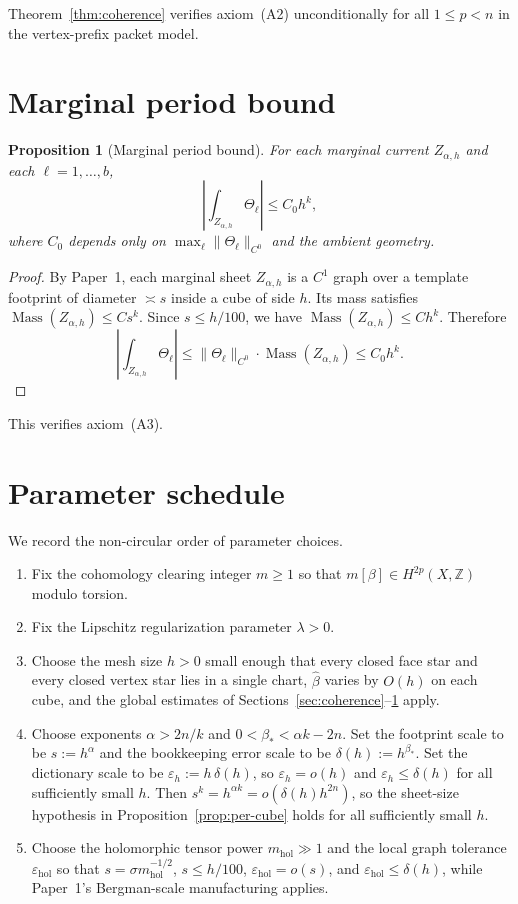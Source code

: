 \documentclass[11pt]{article}
\numberwithin{equation}{section}
\theoremstyle{plain}
\newtheorem{proposition}[theorem]{Proposition}
\theoremstyle{definition}
\theoremstyle{remark}
\DeclareMathOperator{\Mass}{Mass}
\newcommand{\Z}{\mathbb{Z}}
\newcommand{\eps}{\varepsilon}
\newcommand{\mhol}{m_{\mathrm{hol}}}
\begin{document}
Theorem~\ref{thm:coherence} verifies axiom~(A2) unconditionally for all $1\le p<n$ in the vertex-prefix packet model.

\section{Marginal period bound}\label{sec:period}

\begin{proposition}[Marginal period bound]\label{prop:period-bound}
For each marginal current $Z_{\alpha,h}$ and each $\ell=1,\dots,b$,
\[
\left|\int_{Z_{\alpha,h}}\Theta_\ell\right|\le C_0 h^k,
\]
where $C_0$ depends only on $\max_\ell\|\Theta_\ell\|_{C^0}$ and the ambient geometry.
\end{proposition}

\begin{proof}
By Paper~1, each marginal sheet $Z_{\alpha,h}$ is a $C^1$ graph over a template footprint of diameter $\asymp s$ inside a cube of side $h$.  Its mass satisfies $\Mass(Z_{\alpha,h})\le C s^k$.  Since $s\le h/100$, we have $\Mass(Z_{\alpha,h})\le C h^k$.  Therefore
\[
\left|\int_{Z_{\alpha,h}}\Theta_\ell\right|\le \|\Theta_\ell\|_{C^0}\cdot\Mass(Z_{\alpha,h})\le C_0 h^k.
\]
\end{proof}

This verifies axiom~(A3).

\section{Parameter schedule}\label{sec:parameters}

We record the non-circular order of parameter choices.

\begin{enumerate}
\item Fix the cohomology clearing integer $m\ge 1$ so that $m[\beta]\in H^{2p}(X,\Z)$ modulo torsion.
\item Fix the Lipschitz regularization parameter $\lambda>0$.
\item Choose the mesh size $h>0$ small enough that every closed face star and every closed vertex star lies in a single chart, $\widehat\beta$ varies by $O(h)$ on each cube, and the global estimates of Sections~\ref{sec:coherence}--\ref{sec:period} apply.
\item Choose exponents $\alpha>2n/k$ and $0<\beta_\ast<\alpha k-2n$.  Set the footprint scale to be $s:=h^\alpha$ and the bookkeeping error scale to be $\delta(h):=h^{\beta_\ast}$.  Set the dictionary scale to be $\eps_h:=h\,\delta(h)$, so $\eps_h=o(h)$ and $\eps_h\le \delta(h)$ for all sufficiently small $h$.  Then $s^k=h^{\alpha k}=o(\delta(h)h^{2n})$, so the sheet-size hypothesis in Proposition~\ref{prop:per-cube} holds for all sufficiently small $h$.
\item Choose the holomorphic tensor power $\mhol\gg 1$ and the local graph tolerance $\eps_{\mathrm{hol}}$ so that $s=\sigma\mhol^{-1/2}$, $s\le h/100$, $\eps_{\mathrm{hol}}=o(s)$, and $\eps_{\mathrm{hol}}\le \delta(h)$, while Paper~1's Bergman-scale manufacturing applies.
\end{enumerate}
\end{document}
